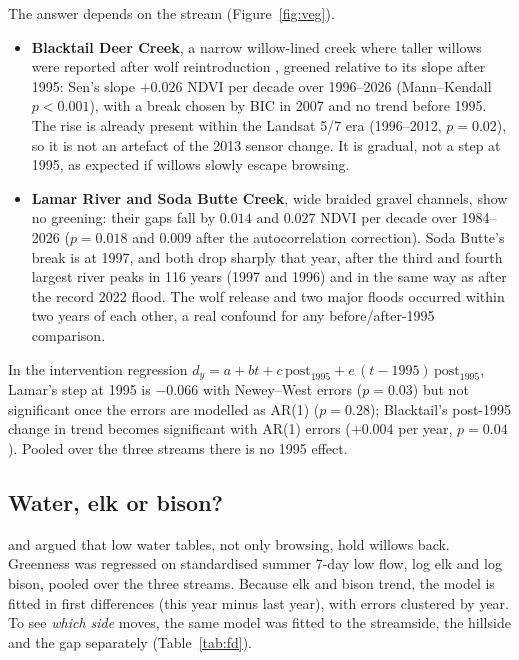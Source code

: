 \documentclass[11pt,a4paper]{article}
\begin{document}
The answer depends on the stream (Figure~\ref{fig:veg}).
\begin{itemize}
\item \textbf{Blacktail Deer Creek}, a narrow willow-lined creek where taller willows were reported after wolf reintroduction \citep{beschta2007}, greened relative to its slope after 1995: Sen's slope $+0.026$ NDVI per decade over 1996--2026 (Mann--Kendall $p<0.001$), with a break chosen by BIC in 2007 and no trend before 1995. The rise is already present within the Landsat 5/7 era (1996--2012, $p=0.02$), so it is not an artefact of the 2013 sensor change. It is gradual, not a step at 1995, as expected if willows slowly escape browsing.
\item \textbf{Lamar River and Soda Butte Creek}, wide braided gravel channels, show no greening: their gaps fall by $0.014$ and $0.027$ NDVI per decade over 1984--2026 ($p=0.018$ and $0.009$ after the autocorrelation correction). Soda Butte's break is at 1997, and both drop sharply that year, after the third and fourth largest river peaks in 116 years (1997 and 1996) and in the same way as after the record 2022 flood. The wolf release and two major floods occurred within two years of each other, a real confound for any before/after-1995 comparison.
\end{itemize}
In the intervention regression $d_y=a+bt+c\,\mathrm{post}_{1995}+e\,(t-1995)\,\mathrm{post}_{1995}$, Lamar's step at 1995 is $-0.066$ with Newey--West errors ($p=0.03$) but not significant once the errors are modelled as AR(1) ($p=0.28$); Blacktail's post-1995 change in trend becomes significant with AR(1) errors ($+0.004$ per year, $p=0.04$). Pooled over the three streams there is no 1995 effect.

\subsection{Water, elk or bison?}
\citet{bilyeu2008} and \citet{marshall2013} argued that low water tables, not only browsing, hold willows back. Greenness was regressed on standardised summer 7-day low flow, log elk and log bison, pooled over the three streams. Because elk and bison trend, the model is fitted in first differences (this year minus last year), with errors clustered by year. To see \emph{which side} moves, the same model was fitted to the streamside, the hillside and the gap separately (Table~\ref{tab:fd}).
\end{document}

